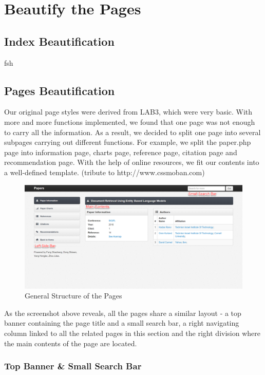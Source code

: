 \documentclass{book}
\begin{document}
\chapter {Beautify the Pages}

\section {Index Beautification}

fsh

\section {Pages Beautification}

Our original page styles were derived from LAB3, which were very basic. With more and more functions implemented, we found that one page was not enough to carry all the information. As a result, we decided to split one page into several subpages carrying out different functions. For example, we split the paper.php page into information page, charts page, reference page, citation page and recommendation page. With the help of online resources, we fit our contents into a well-defined template. (tribute to http://www.cssmoban.com)


\begin{figure}[H]
\centering{}
\includegraphics[scale=0.35]{img/zlt_beau_demo.png}
\caption{General Structure of the Pages}
\end{figure}

As the screenshot above reveals, all the pages share a similar layout - a top banner containing the page title and a small search bar, a right navigating column linked to all the related pages in this section and the right division where the main contents of the page are located.

\subsection {Top Banner \& Small Search Bar}
\end{document}
